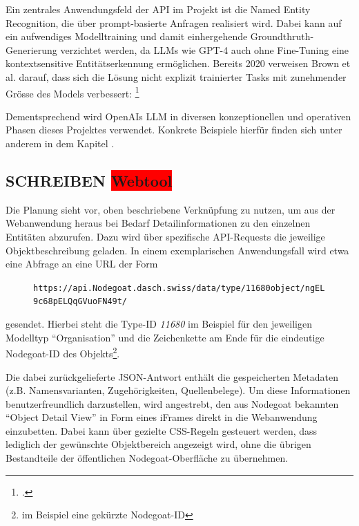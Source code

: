 \documentclass[12pt, a4paper, ngerman, bidi=default]{article}
\let\cite\footcite
\newcommand{\code}[1]{\colorbox{VeryLightGray}{\texttt{#1}}} %
\begin{document}
 Ein zentrales Anwendungsfeld der API im Projekt ist die Named Entity Recognition, die über prompt-basierte Anfragen realisiert wird. Dabei kann auf ein aufwendiges Modelltraining und damit einhergehende Groundthruth-Generierung verzichtet werden, da LLMs wie GPT-4 auch ohne Fine-Tuning eine kontextsensitive Entitätserkennung ermöglichen. Bereits 2020 verweisen Brown et al. darauf, dass sich die Lösung nicht explizit trainierter Tasks mit zunehmender Grösse des Models verbessert: \small\textit{}\cite[vgl.][S.4]{brown_language_2020} 

Dementsprechend wird OpenAIs LLM in diversen konzeptionellen und operativen Phasen dieses Projektes verwendet. Konkrete Beispiele hierfür finden sich unter anderem in dem Kapitel .

\subsection{SCHREIBEN \colorbox{red}{Webtool}}\label{subsec:webtool_chapter}
Die Planung sieht vor, oben beschriebene Verknüpfung zu nutzen, um aus der Webanwendung heraus bei Bedarf Detailinformationen zu den einzelnen Entitäten abzurufen. 
Dazu wird über spezifische API-Requests die jeweilige Objektbeschreibung geladen. In einem exemplarischen Anwendungsfall wird etwa eine Abfrage an eine URL der Form
\begin{figure}
  \hspace*{-0.6cm}%
  \centering\code{https://api.Nodegoat.dasch.swiss/data/type/\colorbox{MediumGray}{11680}object/ngEL9c68pELQqGVuoFN49t/}
\end{figure}
gesendet. Hierbei steht die Type-ID \textit{11680} im Beispiel für den jeweiligen Modelltyp \enquote{Organisation} und die Zeichenkette am Ende für die eindeutige Nodegoat-ID 
des Objekts\footnote{im Beispiel eine gekürzte Nodegoat-ID}.

Die dabei zurückgelieferte JSON-Antwort enthält die gespeicherten Metadaten (z.B. Namensvarianten, Zugehörigkeiten, Quellenbelege). Um diese Informationen benutzerfreundlich darzustellen, 
wird angestrebt, den aus Nodegoat bekannten \enquote{Object Detail View} in Form eines iFrames direkt in die Webanwendung einzubetten. Dabei kann über gezielte CSS-Regeln gesteuert werden, dass 
lediglich der gewünschte Objektbereich angezeigt wird, ohne die übrigen Bestandteile der öffentlichen Nodegoat-Oberfläche zu übernehmen.
\end{document}
